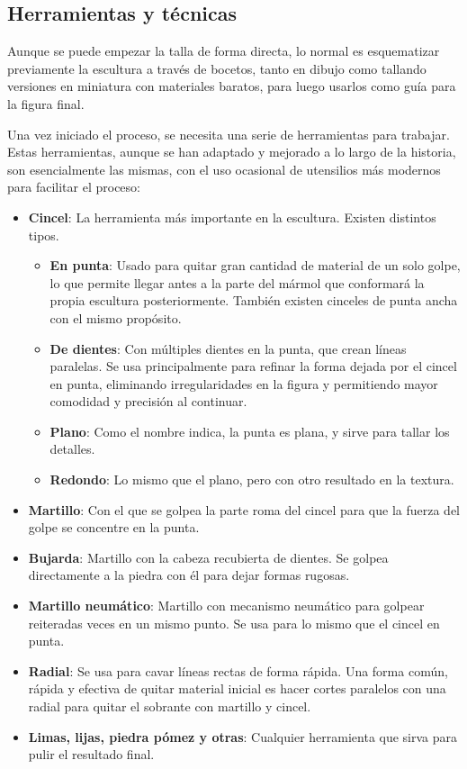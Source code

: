 \subsection{Herramientas y técnicas}

Aunque se puede empezar la talla de forma directa, lo normal es esquematizar previamente la escultura a través de bocetos, tanto en dibujo como tallando versiones en miniatura con materiales baratos, para luego usarlos como guía para la figura final.

Una vez iniciado el proceso, se necesita una serie de herramientas para trabajar. Estas herramientas, aunque se han adaptado y mejorado a lo largo de la historia, son esencialmente las mismas, con el uso ocasional de utensilios más modernos para facilitar el proceso:

\begin{itemize}
	\item \textbf{Cincel}: La herramienta más importante en la escultura. Existen distintos tipos.
	\begin{itemize}
		\item \textbf{En punta}: Usado para quitar gran cantidad de material de un solo golpe, lo que permite llegar antes a la parte del mármol que conformará la propia escultura posteriormente. También existen cinceles de punta ancha con el mismo propósito.
		\item \textbf{De dientes}: Con múltiples dientes en la punta, que crean líneas paralelas. Se usa principalmente para refinar la forma dejada por el cincel en punta, eliminando irregularidades en la figura y permitiendo mayor comodidad y precisión al continuar.
		\item \textbf{Plano}: Como el nombre indica, la punta es plana, y sirve para tallar los detalles.
		\item \textbf{Redondo}: Lo mismo que el plano, pero con otro resultado en la textura.
	\end{itemize}
	\item \textbf{Martillo}: Con el que se golpea la parte roma del cincel para que la fuerza del golpe se concentre en la punta.
	\item \textbf{Bujarda}: Martillo con la cabeza recubierta de dientes. Se golpea directamente a la piedra con él para dejar formas rugosas.
	\item \textbf{Martillo neumático}: Martillo con mecanismo neumático para golpear reiteradas veces en un mismo punto. Se usa para lo mismo que el cincel en punta.
	\item \textbf{Radial}: Se usa para cavar líneas rectas de forma rápida. Una forma común, rápida y efectiva de quitar material inicial es hacer cortes paralelos con una radial para quitar el sobrante con martillo y cincel.
	\item \textbf{Limas, lijas, piedra pómez y otras}: Cualquier herramienta que sirva para pulir el resultado final.
\end{itemize}

